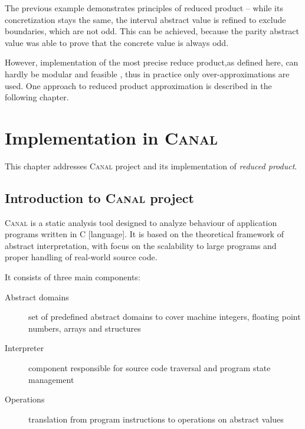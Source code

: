 \documentclass[12pt,oneside]{fithesis2}
\theoremstyle{definition}
\begin{document}
The previous example demonstrates principles of reduced product -- while its concretization stays the same, the interval abstract value is refined to exclude boundaries, which are not odd. This can be achieved, because the parity abstract value was able to prove that the concrete value is always odd.

However, implementation of the most precise reduce product,as defined here, can hardly be modular and feasible \cite{CousotCousotMauborgne-FoSSaCS-11}, thus in practice only over-approximations are used. One approach to reduced product approximation is described in the following chapter.

\chapter{Implementation in \textsc{Canal}}\label{ch:implementation}

This chapter addresses \textsc{Canal} project and its implementation of \textit{reduced product}.

\section{Introduction to \textsc{Canal} project}

\textsc{Canal} is a static analysis tool designed to analyze behaviour of
application programs written in C [language]. It is based on the theoretical
framework of abstract interpretation, with focus on the scalability to
large programs and proper handling of real-world source code. \cite{Canal}

It consists of three main components:

\begin{description}
  \item[Abstract domains] set of predefined abstract domains to cover machine integers, floating point numbers, arrays and structures
  \item[Interpreter] component responsible for source code traversal and program state management
  \item[Operations] translation from program instructions to operations on abstract values
\end{description}
\end{document}
